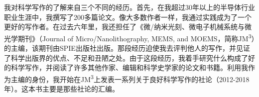 我对科学写作的了解来自三个不同的经历。首先，在我超过30年以上的半导体行业职业生涯中，我撰写了200多篇论文。像大多数作者一样，我通过实践成为了一个更好的写作者。在过去六年里，我还担任了《微/纳米光刻、微电子机械系统与微光学期刊》（Journal of Micro/Nanolithography, MEMS, and MOEMS，简称JM\textsuperscript{3}）的主编，该期刊由SPIE出版社出版。那段经历迫使我去评判他人的写作，并见证了科学出版界的优点、不足和丑陋之处。由于这段经历，我着手研究什么构成了好的科学写作，并阅读了许多其他作家、编辑和科学史学家的论文和书籍。利用我作为主编的身份，我开始在JM\textsuperscript{3}上发表一系列关于良好科学写作的社论（2012-2018年）。这本书主要是那些社论的汇编。

